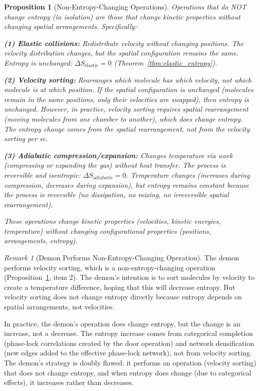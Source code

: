 \documentclass[12pt,a4paper]{article}
\newtheorem{proposition}[theorem]{Proposition}
\theoremstyle{definition}
\theoremstyle{remark}
\newtheorem{remark}[theorem]{Remark}
\begin{document}
\begin{proposition}[Non-Entropy-Changing Operations]
\label{prop:non_entropy_changing}
Operations that do NOT change entropy (in isolation) are those that change kinetic properties without changing spatial arrangements. Specifically:

\textbf{(1) Elastic collisions:} Redistribute velocity without changing positions. The velocity distribution changes, but the spatial configuration remains the same. Entropy is unchanged: $\Delta S_{\text{elastic}} = 0$ (Theorem~\ref{thm:elastic_entropy}).

\textbf{(2) Velocity sorting:} Rearranges which molecule has which velocity, not which molecule is at which position. If the spatial configuration is unchanged (molecules remain in the same positions, only their velocities are swapped), then entropy is unchanged. However, in practice, velocity sorting requires spatial rearrangement (moving molecules from one chamber to another), which does change entropy. The entropy change comes from the spatial rearrangement, not from the velocity sorting per se.

\textbf{(3) Adiabatic compression/expansion:} Changes temperature via work (compressing or expanding the gas) without heat transfer. The process is reversible and isentropic: $\Delta S_{\text{adiabatic}} = 0$. Temperature changes (increases during compression, decreases during expansion), but entropy remains constant because the process is reversible (no dissipation, no mixing, no irreversible spatial rearrangement).

These operations change kinetic properties (velocities, kinetic energies, temperature) without changing configurational properties (positions, arrangements, entropy).
\end{proposition}

\begin{remark}[Demon Performs Non-Entropy-Changing Operation]
\label{rem:demon_non_entropy}
The demon performs velocity sorting, which is a non-entropy-changing operation (Proposition~\ref{prop:non_entropy_changing}, item 2). The demon's intention is to sort molecules by velocity to create a temperature difference, hoping that this will decrease entropy. But velocity sorting does not change entropy directly because entropy depends on spatial arrangements, not velocities.

In practice, the demon's operation does change entropy, but the change is an increase, not a decrease. The entropy increase comes from categorical completion (phase-lock correlations created by the door operation) and network densification (new edges added to the effective phase-lock network), not from velocity sorting. The demon's strategy is doubly flawed: it performs an operation (velocity sorting) that does not change entropy, and when entropy does change (due to categorical effects), it increases rather than decreases.
\end{remark}
\end{document}
